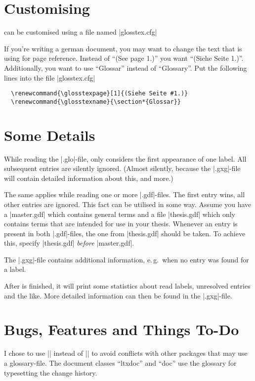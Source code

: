 \documentclass[draft,a4paper]{ltxdoc}
\begin{document}
{{{{%

\section{Customising}
\GlossTeX{} can be customised using a file named |glosstex.cfg|

If you're writing a german document, you may want to change the text
that \GlossTeX{} is using for page reference. Instead of ``(See page
1.)'' you want ``(Siehe Seite 1.)''. Additionally, you want to use
"`Glossar"' instead of "`Glossary"'. Put the following lines into the
file |glosstex.cfg|
%
\begin{verbatim}
  \renewcommand{\glosstexpage}[1]{(Siehe Seite #1.)}
  \renewcommand{\glosstexname}{\section*{Glossar}}
\end{verbatim}


\section{Some Details}
While reading the |.glo|-file, \GlossTeX{} only considers the first
appearance of one label. All subsequent entries are silently ignored.
(Almost silently, because the |.gxg|-file will contain detailed
information about this, and more.)

The same applies while reading one or more |.gdf|-files. The first
entry wins, all other entries are ignored. This fact can be utilised
in some way. Assume you have a |master.gdf| which contains general
terms and a file |thesis.gdf| which only contains terms that are
intended for use in your thesis. Whenever an entry is present in both
|.gdf|-files, the one from |thesis.gdf| should be taken. To achieve
this, specify |thesis.gdf| \emph{before} |master.gdf|.

The |.gxg|-file contains additional information, e.\,g.~when no entry
was found for a label.

After \GlossTeX{} is finished, it will print some statistics about read
labels, unresolved entries and the like. More detailed information can
then be found in the |.gxg|-file.


\section{Bugs, Features and Things To-Do}
I chose to use |\glosstex| instead of |\glossary| to avoid conflicts
with other packages that may use a glossary-file. The document classes
``ltxdoc'' and ``doc'' use the glossary for typesetting the change
history. 

}}}}
\end{document}
